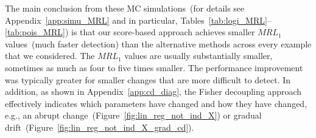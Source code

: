 \documentclass[twoside,11pt]{article}
\begin{document}
The main conclusion from these MC simulations~(for details see Appendix~\ref{app:simu_MRL} and in particular, Tables~\ref{tab:logi_MRL}--\ref{tab:pois_MRL}) is that our score-based approach achieves smaller $MRL_1$ values~(much faster detection) than the alternative methods across every example that we considered. The $MRL_1$ values are usually substantially smaller, sometimes as much as four to five times smaller. The performance improvement was typically greater for smaller changes that are more difficult to detect. In addition, as shown in Appendix~\ref{app:cd_diag}, the Fisher decoupling approach effectively indicates which parameters have changed and how they have changed, e.g., an abrupt change~(Figure~\ref{fig:lin_reg_not_ind_X}) or gradual drift~(Figure~\ref{fig:lin_reg_not_ind_X_grad_cd}). %
\end{document}
